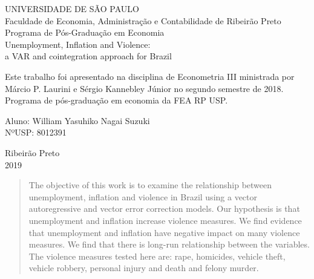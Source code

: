 \documentclass[11pt, a4paper]{article}
\begin{document}
\begingroup  
  \centering

   \small UNIVERSIDADE DE SÃO PAULO\\Faculdade de Economia, Administração e Contabilidade de Ribeirão Preto\\Programa de Pós-Graduação em Economia\\[10em]
     
  \Large Unemployment, Inflation and Violence: \\a VAR and cointegration approach for Brazil\\[10 em]
  

\begin{flushright}
\begin{minipage}[t]{0.5\textwidth}
\small Este trabalho foi apresentado na disciplina de Econometria III ministrada por Márcio P. Laurini e Sérgio Kannebley Júnior no segundo semestre de 2018. Programa de pós-graduação em economia da FEA RP USP.\\[5em]\par
\end{minipage}
\end{flushright}

\small Aluno: William Yasuhiko Nagai Suzuki \\ NºUSP: 8012391	\\   [5em]\par




\vfill{\small Ribeirão Preto\\ 2019}\\[5em]

\thispagestyle{empty}

\endgroup


\clearpage\mbox{}\thispagestyle{empty}\clearpage

\begin{abstract}


The objective of this work is to examine the relationship between unemployment, inflation and violence in Brazil using a vector autoregressive and vector error correction  models. Our hypothesis is that unemployment and inflation increase violence measures. We find evidence that unemployment and inflation have negative impact on many violence measures. We find that there is long-run relationship between the variables. The violence measures tested here are:  rape, homicides, vehicle theft, vehicle robbery, personal injury and death and felony murder. 

\end{abstract}
\end{document}
